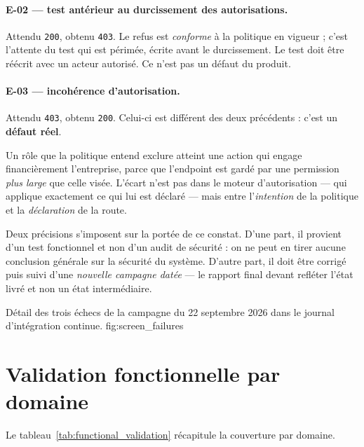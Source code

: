 \paragraph{E-02 — test antérieur au durcissement des autorisations.} Attendu
\texttt{200}, obtenu \texttt{403}. Le refus est \emph{conforme} à la politique
en vigueur ; c'est l'attente du test qui est périmée, écrite avant le
durcissement. Le test doit être réécrit avec un acteur autorisé. Ce n'est pas
un défaut du produit.

\paragraph{E-03 — incohérence d'autorisation.} Attendu \texttt{403}, obtenu
\texttt{200}. Celui-ci est différent des deux précédents : c'est un
\textbf{défaut réel}.

Un rôle que la politique entend exclure atteint une action qui engage
financièrement l'entreprise, parce que l'endpoint est gardé par une permission
\emph{plus large} que celle visée. L'écart n'est pas dans le moteur
d'autorisation — qui applique exactement ce qui lui est déclaré — mais entre
l'\emph{intention} de la politique et la \emph{déclaration} de la route.

Deux précisions s'imposent sur la portée de ce constat. D'une part, il provient
d'un test fonctionnel et non d'un audit de sécurité : on ne peut en tirer
aucune conclusion générale sur la sécurité du système. D'autre part, il doit
être corrigé puis suivi d'une \emph{nouvelle campagne datée} — le rapport final
devant refléter l'état livré et non un état intermédiaire.

  {Détail des trois échecs de la campagne du 22 septembre 2026 dans le journal
   d'intégration continue.}
  {fig:screen_failures}

\section{Validation fonctionnelle par domaine}
\label{sec:functional_validation}

Le tableau~\ref{tab:functional_validation} récapitule la couverture par
domaine.

